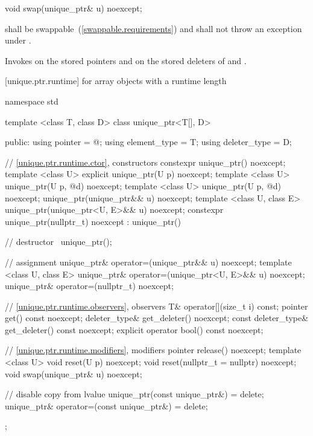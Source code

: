 %
\begin{itemdecl}
void swap(unique_ptr& u) noexcept;
\end{itemdecl}

\begin{itemdescr}
\pnum
\requires {} shall be
swappable~(\ref{swappable.requirements}) and shall
not throw an exception
under .

\pnum
\effects Invokes  on the stored pointers and on the stored
deleters of  and .
\end{itemdescr}

[unique.ptr.runtime]{ for array objects with a runtime length}

%
\begin{codeblock}
namespace std {
  template <class T, class D> class unique_ptr<T[], D> {
  public:
    using pointer      = @\seebelow@;
    using element_type = T;
    using deleter_type = D;

    // \ref{unique.ptr.runtime.ctor}, constructors
    constexpr unique_ptr() noexcept;
    template <class U> explicit unique_ptr(U p) noexcept;
    template <class U> unique_ptr(U p, @\seebelow@ d) noexcept;
    template <class U> unique_ptr(U p, @\seebelow@ d) noexcept;
    unique_ptr(unique_ptr&& u) noexcept;
    template <class U, class E>
      unique_ptr(unique_ptr<U, E>&& u) noexcept;
    constexpr unique_ptr(nullptr_t) noexcept : unique_ptr() { }

    // destructor
    ~unique_ptr();

    // assignment
    unique_ptr& operator=(unique_ptr&& u) noexcept;
    template <class U, class E>
      unique_ptr& operator=(unique_ptr<U, E>&& u) noexcept;
    unique_ptr& operator=(nullptr_t) noexcept;

    // \ref{unique.ptr.runtime.observers}, observers
    T& operator[](size_t i) const;
    pointer get() const noexcept;
    deleter_type& get_deleter() noexcept;
    const deleter_type& get_deleter() const noexcept;
    explicit operator bool() const noexcept;

    // \ref{unique.ptr.runtime.modifiers}, modifiers
    pointer release() noexcept;
    template <class U> void reset(U p) noexcept;
    void reset(nullptr_t = nullptr) noexcept;
    void swap(unique_ptr& u) noexcept;

    // disable copy from lvalue
    unique_ptr(const unique_ptr&) = delete;
    unique_ptr& operator=(const unique_ptr&) = delete;
  };
}
\end{codeblock}

